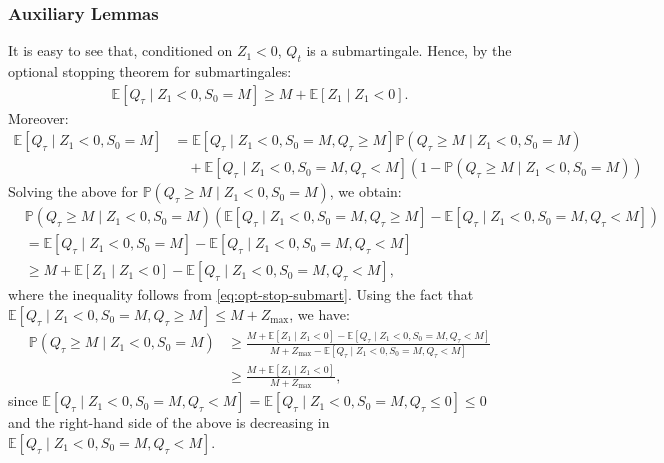 \documentclass[mnsc,nonblindrev]{informs3}
\newcommand{\E}{\mathbb{E}}
\newcommand{\pr}{\mathbb{P}}
\renewcommand{\Pr}{\pr}
\renewenvironment{proof}[1][Proof]{%
  \par\noindent{\itshape #1.} \ignorespaces
}{%
  \hfill\Halmos\par
}
\begin{document}
\begin{APPENDICES}
\subsubsection{Auxiliary Lemmas}\label{apx:static-bad}

\BoundStaticBad*

\begin{proof}
It is easy to see that, conditioned on $Z_1 < 0$, $Q_t$ is a submartingale. Hence, by the optional stopping theorem for submartingales:
\begin{align}\label{eq:opt-stop-submart}
\E[Q_\tau \mid Z_1 < 0, S_0 = M] \geq M + \E[Z_1 \mid Z_1 < 0].
\end{align}
Moreover:
\begin{align*}
\E[Q_\tau \mid Z_1 < 0, S_0 = M] &= \E[Q_\tau \mid Z_1 < 0, S_0 = M, Q_\tau \geq M] \Pr(Q_\tau \geq M \mid Z_1 < 0, S_0 = M)\\
&\quad + \E[Q_\tau \mid Z_1 < 0, S_0 = M, Q_\tau < M] \left(1-\Pr(Q_\tau {\geq} M \mid Z_1 < 0, S_0 = M)\right)
\end{align*}
Solving the above for $\Pr(Q_\tau \geq M \mid Z_1 < 0, S_0 = M)$, we obtain:
\begin{align*}
&\Pr(Q_\tau \geq M \mid Z_1 < 0, S_0 = M)\left(\E[Q_\tau \mid Z_1 < 0, S_0 = M, Q_\tau \geq M]-\E[Q_\tau \mid Z_1 < 0, S_0 = M, Q_\tau < M]\right)\\ &= \E[Q_\tau \mid Z_1 < 0, S_0 = M]-\E[Q_\tau \mid Z_1 < 0, S_0 = M, Q_\tau < M] \\
&\geq M + \E[Z_1 \mid Z_1 < 0] - \E[Q_\tau \mid Z_1 < 0, S_0 = M, Q_\tau < M],
\end{align*}
where the inequality follows from \eqref{eq:opt-stop-submart}. Using the fact that $\E[Q_\tau \mid Z_1 < 0, S_0 = M, Q_\tau \geq M] \leq M + Z_{\max}$, we have:
\begin{align*}
\Pr(Q_\tau \geq M \mid Z_1 < 0, S_0 = M) &\geq \frac{M + \E[Z_1 \mid Z_1 < 0] - \E[Q_\tau \mid Z_1 < 0, S_0 = M, Q_\tau < M]}{M+Z_{\max}-\E[Q_\tau \mid Z_1 < 0, S_0 = M, Q_\tau < M]}\\
&\geq \frac{M + \E[Z_1 \mid Z_1 < 0]}{M+Z_{\max}},
\end{align*}
since $\E[Q_\tau \mid Z_1 < 0, S_0 = M, Q_\tau < M] = \E[Q_\tau \mid Z_1 < 0, S_0 = M, Q_\tau \leq 0 ] \leq 0$ and the right-hand side of the above is decreasing in $\E[Q_\tau \mid Z_1 < 0, S_0 = M, Q_\tau < M]$.
\end{proof}




\end{APPENDICES}
\end{document}
